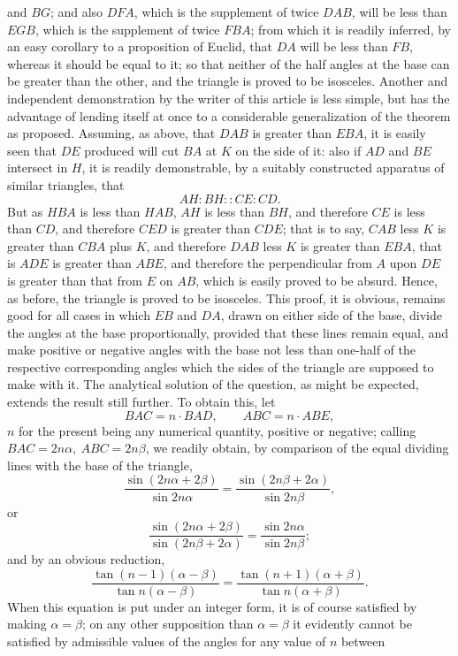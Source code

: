 \documentclass[11pt]{article}
\newcommand{\sourcepage}[1]{\marginpar{\scriptsize p.~#1}}
\begin{document}
{{\sourcepage{393}
and $BG$; and also $DFA$, which is the supplement of twice $DAB$, will be less than $EGB$, which is the supplement of twice $FBA$; from which it is readily inferred, by an easy corollary to a proposition of Euclid, that $DA$ will be less than $FB$, whereas it should be equal to it; so that neither of the half angles at the base can be greater than the other, and the triangle is proved to be isosceles. Another and independent demonstration by the writer of this article is less simple, but has the advantage of lending itself at once to a considerable generalization of the theorem as proposed. Assuming, as above, that $DAB$ is greater than $EBA$, it is easily seen that $DE$ produced will cut $BA$ at $K$ on the side of it: also if $AD$ and $BE$ intersect in $H$, it is readily demonstrable, by a suitably constructed apparatus of similar triangles, that
\[
AH:BH::CE:CD.
\]
But as $HBA$ is less than $HAB$, $AH$ is less than $BH$, and therefore $CE$ is less than $CD$, and therefore $CED$ is greater than $CDE$; that is to say, $CAB$ less $K$ is greater than $CBA$ plus $K$, and therefore $DAB$ less $K$ is greater than $EBA$, that is $ADE$ is greater than $ABE$, and therefore the perpendicular from $A$ upon $DE$ is greater than that from $E$ on $AB$, which is easily proved to be absurd. Hence, as before, the triangle is proved to be isosceles. This proof, it is obvious, remains good for all cases in which $EB$ and $DA$, drawn on either side of the base, divide the angles at the base proportionally, provided that these lines remain equal, and make positive or negative angles with the base not less than one-half of the respective corresponding angles which the sides of the triangle are supposed to make with it. The analytical solution of the question, as might be expected, extends the result still further. To obtain this, let
\[
BAC=n\cdot BAD,\qquad ABC=n\cdot ABE,
\]
$n$ for the present being any numerical quantity, positive or negative; calling $BAC=2n\alpha,\ ABC=2n\beta$, we readily obtain, by comparison of the equal dividing lines with the base of the triangle,
\[
\frac{\sin(2n\alpha+2\beta)}{\sin 2n\alpha}
=
\frac{\sin(2n\beta+2\alpha)}{\sin 2n\beta},
\]
or
\[
\frac{\sin(2n\alpha+2\beta)}{\sin(2n\beta+2\alpha)}
=
\frac{\sin2n\alpha}{\sin2n\beta};
\]
and by an obvious reduction,
\[
\frac{\tan(n-1)(\alpha-\beta)}{\tan n(\alpha-\beta)}
=
\frac{\tan(n+1)(\alpha+\beta)}{\tan n(\alpha+\beta)}.
\]
When this equation is put under an integer form, it is of course satisfied by making $\alpha=\beta$; on any other supposition than $\alpha=\beta$ it evidently cannot be satisfied by admissible values of the angles for any value of $n$ between

}}
\end{document}
